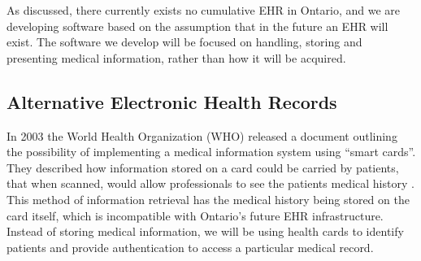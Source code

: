 As discussed, there currently exists no cumulative EHR in Ontario, and we are developing software based on the assumption that in the future an EHR will exist. The software we develop will be focused on handling, storing and presenting medical information, rather than how it will be acquired.

\subsection{Alternative Electronic Health Records}

In 2003 the World Health Organization (WHO) released a document outlining the possibility of implementing a medical information system using “smart cards”. They described how information stored on a card could be carried by patients, that when scanned, would allow professionals to see the patients medical history \cite{smartcard1}. This method of information retrieval has the medical history being stored on the card itself, which is incompatible with Ontario's future EHR infrastructure. Instead of storing medical information, we will be using health cards to identify patients and provide authentication to access a particular medical record.
